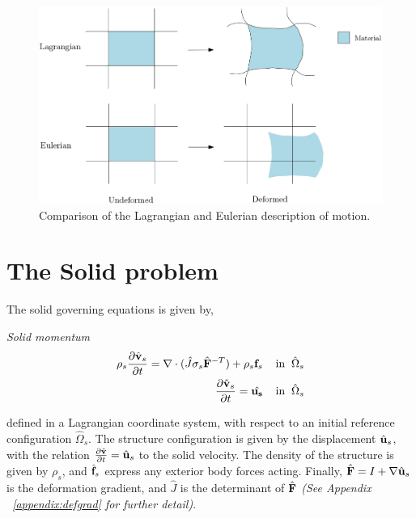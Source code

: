 \begin{figure}[h!]
  \centering
    \includegraphics[scale=0.28]{./Fig/lageul.png}
      \caption{Comparison of the Lagrangian and Eulerian description of motion.}
      \label{fig:lageul}
\end{figure}


\section{The Solid problem}
\label{sec:solprob}
The solid governing equations is given by, 
\begin{equat}
\textit{Solid momentum}
\begin{align}
\rho_s \frac{\partial \hat{\mathbf{v}}_s}{\partial t} = \nabla \cdot ( \hat{J} \sigma_s \hat{\mathbf{F}}^{-T})  + \rho_s \mathbf{f}_s
\hspace{4mm} \text{in} \hspace{2mm} \hat{\Omega}_s \\
\frac{\partial \hat{\mathbf{v}}_s}{\partial t} = \hat{\mathbf{u_s}} \hspace{4mm} \text{in} \hspace{2mm}  \hat{\Omega}_s
\end{align}
\end{equat}
defined in a Lagrangian coordinate system, with respect to an initial reference configuration $\hat{\Omega}_s$. The structure configuration is given by the displacement $\hat{\mathbf{u}}_s$, with the relation $\frac{\partial \hat{\mathbf{v}}}{\partial t} = \hat{\mathbf{u}}_s$ to the solid velocity. The density of the structure is given by $\rho_s$, and $\hat{\mathbf{f}}_s$ express any exterior body forces acting. Finally, $\hat{\mathbf{F}} = I + \nabla \hat{\mathbf{u}}_s$ is the deformation gradient, and $\hat{J}$ is the determinant of $\hat{\mathbf{F}}$ \textit{(See Appendix ~\ref{appendix:defgrad}  for further detail)}. \\

